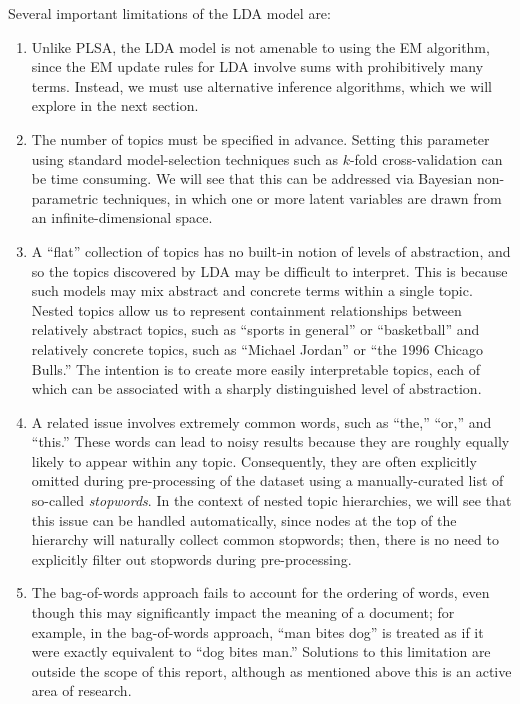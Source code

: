 \documentclass{article}
\begin{document}
Several important limitations of the LDA model are:
\begin{enumerate}
\item Unlike PLSA, the LDA model is not amenable to using the EM algorithm, since the EM update rules for LDA involve sums with prohibitively many terms.
Instead, we must use alternative inference algorithms, which we will explore in the next section.
\item The number of topics must be specified in advance.
Setting this parameter using standard model-selection techniques such as $k$-fold cross-validation can be time consuming.
We will see that this can be addressed via Bayesian non-parametric techniques, in which one or more latent variables are drawn from an infinite-dimensional space.
\item A ``flat'' collection of topics has no built-in notion of levels of abstraction, and so the topics discovered by LDA may be difficult to interpret.
This is because such models may mix abstract and concrete terms within a single topic.
Nested topics allow us to represent containment relationships between relatively abstract topics, such as ``sports in general'' or ``basketball'' and relatively concrete topics, such as ``Michael Jordan'' or ``the 1996 Chicago Bulls.''
The intention is to create more easily interpretable topics, each of which can be associated with a sharply distinguished level of abstraction.
\item A related issue involves extremely common words, such as ``the,'' ``or,'' and ``this.''
These words can lead to noisy results because they are roughly equally likely to appear within any topic.
Consequently, they are often explicitly omitted during pre-processing of the dataset using a manually-curated list of so-called \emph{stopwords}.
In the context of nested topic hierarchies, we will see that this issue can be handled automatically, since nodes at the top of the hierarchy will naturally collect common stopwords; then, there is no need to explicitly filter out stopwords during pre-processing.
\item The bag-of-words approach fails to account for the ordering of words, even though this may significantly impact the meaning of a document; for example, in the bag-of-words approach, ``man bites dog'' is treated as if it were exactly equivalent to ``dog bites man.''
Solutions to this limitation are outside the scope of this report, although as mentioned above this is an active area of research.
\end{enumerate}
\end{document}
